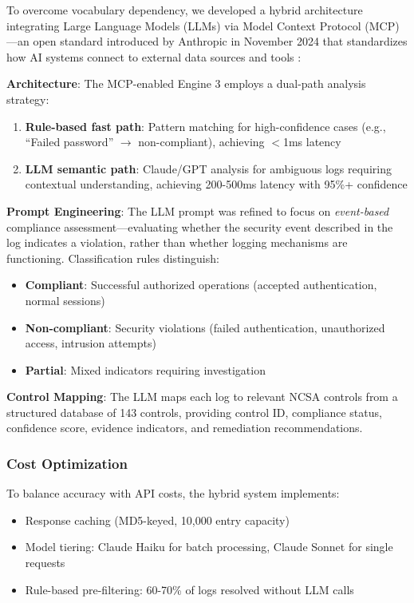 \documentclass[11pt,conference]{IEEEtran}
\begin{document}
To overcome vocabulary dependency, we developed a hybrid architecture integrating Large Language Models (LLMs) via Model Context Protocol (MCP) \cite{mcp_anthropic, mcp_spec}---an open standard introduced by Anthropic in November 2024 that standardizes how AI systems connect to external data sources and tools \cite{mcp_landscape}:

\textbf{Architecture}: The MCP-enabled Engine 3 employs a dual-path analysis strategy:
\begin{enumerate}
    \item \textbf{Rule-based fast path}: Pattern matching for high-confidence cases (e.g., ``Failed password'' $\rightarrow$ non-compliant), achieving $<$1ms latency
    \item \textbf{LLM semantic path}: Claude/GPT analysis for ambiguous logs requiring contextual understanding, achieving 200-500ms latency with 95\%+ confidence
\end{enumerate}

\textbf{Prompt Engineering}: The LLM prompt was refined to focus on \textit{event-based} compliance assessment---evaluating whether the security event described in the log indicates a violation, rather than whether logging mechanisms are functioning. Classification rules distinguish:
\begin{itemize}
    \item \textbf{Compliant}: Successful authorized operations (accepted authentication, normal sessions)
    \item \textbf{Non-compliant}: Security violations (failed authentication, unauthorized access, intrusion attempts)
    \item \textbf{Partial}: Mixed indicators requiring investigation
\end{itemize}

\textbf{Control Mapping}: The LLM maps each log to relevant NCSA controls from a structured database of 143 controls, providing control ID, compliance status, confidence score, evidence indicators, and remediation recommendations.

\subsubsection{Cost Optimization}

To balance accuracy with API costs, the hybrid system implements:
\begin{itemize}
    \item Response caching (MD5-keyed, 10,000 entry capacity)
    \item Model tiering: Claude Haiku for batch processing, Claude Sonnet for single requests
    \item Rule-based pre-filtering: 60-70\% of logs resolved without LLM calls
\end{itemize}
\end{document}
